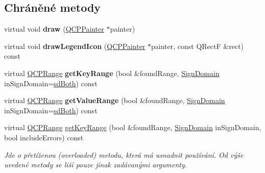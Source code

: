 \subsection*{Chráněné metody}
\begin{DoxyCompactItemize}
\item 
\hypertarget{classQCPGraph_a659218cc62c2a7786213d9dd429c1c8d}{}virtual void {\bfseries draw} (\hyperlink{classQCPPainter}{Q\+C\+P\+Painter} $\ast$painter)\label{classQCPGraph_a659218cc62c2a7786213d9dd429c1c8d}

\item 
\hypertarget{classQCPGraph_a32115df0e940cf8ca7b687873c2d02ee}{}virtual void {\bfseries draw\+Legend\+Icon} (\hyperlink{classQCPPainter}{Q\+C\+P\+Painter} $\ast$painter, const Q\+Rect\+F \&rect) const \label{classQCPGraph_a32115df0e940cf8ca7b687873c2d02ee}

\item 
\hypertarget{classQCPGraph_afc246ce6201ff564ac440efaec52ab11}{}virtual \hyperlink{classQCPRange}{Q\+C\+P\+Range} {\bfseries get\+Key\+Range} (bool \&found\+Range, \hyperlink{classQCPAbstractPlottable_a661743478a1d3c09d28ec2711d7653d8}{Sign\+Domain} in\+Sign\+Domain=\hyperlink{classQCPAbstractPlottable_a661743478a1d3c09d28ec2711d7653d8a082b98cfb91a7363a3b5cd17b0c1cd60}{sd\+Both}) const \label{classQCPGraph_afc246ce6201ff564ac440efaec52ab11}

\item 
\hypertarget{classQCPGraph_a856e90b8ab6b31c344b14a863ab9e5d2}{}virtual \hyperlink{classQCPRange}{Q\+C\+P\+Range} {\bfseries get\+Value\+Range} (bool \&found\+Range, \hyperlink{classQCPAbstractPlottable_a661743478a1d3c09d28ec2711d7653d8}{Sign\+Domain} in\+Sign\+Domain=\hyperlink{classQCPAbstractPlottable_a661743478a1d3c09d28ec2711d7653d8a082b98cfb91a7363a3b5cd17b0c1cd60}{sd\+Both}) const \label{classQCPGraph_a856e90b8ab6b31c344b14a863ab9e5d2}

\item 
virtual \hyperlink{classQCPRange}{Q\+C\+P\+Range} \hyperlink{classQCPGraph_aa75c6f028124032416a5cf7145dfba60}{get\+Key\+Range} (bool \&found\+Range, \hyperlink{classQCPAbstractPlottable_a661743478a1d3c09d28ec2711d7653d8}{Sign\+Domain} in\+Sign\+Domain, bool include\+Errors) const 
\begin{DoxyCompactList}\small\item\em Jde o přetíženou (overloaded) metodu, která má usnadnit používání. Od výše uvedené metody se liší pouze jinak zadávanými argumenty.


\end{DoxyCompactList}
\end{DoxyCompactItemize}
